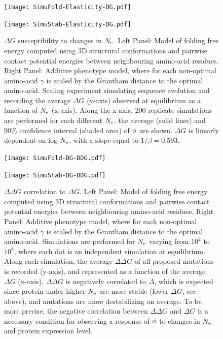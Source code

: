 \begin{figure}[H]
	\centering
	\begin{minipage}{0.49\linewidth}
		\texttt{[image: SimuFold-Elasticity-DG.pdf]}
	\end{minipage}%
	\hfill
	\begin{minipage}{0.49\linewidth}
		\texttt{[image: SimuStab-Elasticity-DG.pdf]}
	\end{minipage}
	\caption[$\Delta G$ susceptibility to changes in $\Ne$]{
		$\Delta G$ susceptibility to changes in $\Ne$.
		Left Panel: Model of folding free energy computed using 3D structural conformations and pairwise contact potential energies between neighbouring amino-acid residues. 
		Right Panel: Additive phenotype model, where for each non-optimal amino-acid $\gamma$ is scaled by the Grantham distance to the optimal amino-acid.
		Scaling experiment simulating sequence evolution and recording the average $\Delta G$ (y-axis) observed at equilibrium as a function of $\Ne$ (x-axis).
		Along the x-axis, $200$ replicate simulations are performed for each different $\Ne$, the average (solid lines) and $90\%$ confidence interval (shaded area) of $\phi$ are shown.
		$\Delta G$ is linearly dependent on log-$\Ne$, with a slope equal to $1/\beta=0.593$.
	}
\end{figure}

\begin{figure}[H]
	\centering
	\begin{minipage}{0.49\linewidth}
		\texttt{[image: SimuFold-DG-DDG.pdf]}
	\end{minipage}%
	\hfill
	\begin{minipage}{0.49\linewidth}
		\texttt{[image: SimuStab-DG-DDG.pdf]}
	\end{minipage}

	\caption[$\Delta \Delta G$ correlation to $\Delta G$]{
		$\Delta \Delta G$ correlation to $\Delta G$.
		Left Panel: Model of folding free energy computed using 3D structural conformations and pairwise contact potential energies between neighbouring amino-acid residues. 
		Right Panel: Additive phenotype model, where for each non-optimal amino-acid $\gamma$ is scaled by the Grantham distance to the optimal amino-acid.
		Simulations are performed for $\Ne$ varying from $10^2$ to $10^8$, where each dot is an independent simulation at equilibrium.
		Along each simulation, the average $\Delta \Delta G$ of all proposed mutations is recorded (y-axis), and represented as a function of the average $\Delta G$ (x-axis).
		$\Delta \Delta G$ is negatively correlated to $\Delta$, which is expected since protein under higher $\Ne$ are more stable (lower $\Delta G$, see above), and mutations are more destabilizing on average.
		To be more precise, the negative correlation between $\Delta \Delta G$ and $\Delta G$ is a necessary condition for observing a response of $\phi$ to changes in $\Ne$ and protein expression level\citep{Serohijos2012, Goldstein2013}. 
	}
\end{figure}

